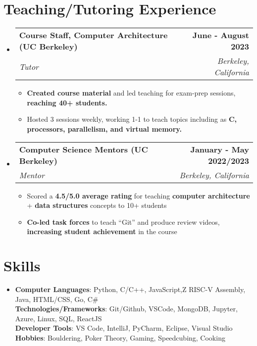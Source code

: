 \documentclass[letterpaper,11pt]{article}
\makeatletter
\newcommand{\resumeItem}[1]{
  \item\small{
    {#1 \vspace{-2pt}}
  }
}
\newcommand{\resumeSubheading}[4]{
  \vspace{-2pt}\item
    \begin{tabular*}{1.0\textwidth}[t]{l@{\extracolsep{\fill}}r}
      \textbf{#1} & \textbf{\small #2} \\
      \textit{\small#3} & \textit{\small #4} \\
    \end{tabular*}\vspace{-7pt}
}
\newcommand{\resumeSubHeadingListStart}{\begin{itemize}[leftmargin=0.0in, label={}]}
\newcommand{\resumeSubHeadingListEnd}{\end{itemize}}
\newcommand{\resumeItemListStart}{\begin{itemize}}
\newcommand{\resumeItemListEnd}{\end{itemize}\vspace{-5pt}}
\makeatother
\begin{document}
\vspace{0pt}


\section{Teaching/Tutoring Experience}
\resumeSubHeadingListStart

\resumeSubheading
{Course Staff, Computer Architecture (UC Berkeley)}{June - August 2023}
{Tutor}{Berkeley, California}
\resumeItemListStart
\resumeItem{\textbf{Created course material} and led teaching for exam-prep sessions, \textbf{reaching 40+ students.}}
  \resumeItem{Hosted 3 sessions weekly, working 1-1 to teach topics including as \textbf{C, processors, parallelism, and virtual memory.}}
  \resumeItemListEnd

\resumeSubheading
{Computer Science Mentors (UC Berkeley)}{January - May 2022/2023}
{Mentor}{Berkeley, California}
\resumeItemListStart
  \resumeItem{Scored a \textbf{4.5/5.0 average rating} for teaching \textbf{computer architecture} + \textbf{data structures} concepts to 10+ students}
  \resumeItem{\textbf{Co-led task forces} to teach ``Git'' and produce review videos, \textbf{increasing student achievement} in the course}
  \resumeItemListEnd

\resumeSubHeadingListEnd
\vspace{-16pt}

\section{Skills}
 \begin{itemize}[leftmargin=0.15in, label={}]
    \item{
      \textbf{Computer Languages}{: Python, C/C++, JavaScript,Z RISC-V Assembly, Java, HTML/CSS, Go, C\#} \\
      \vspace{4pt}
      \textbf{Technologies/Frameworks}{: Git/Github, VSCode, MongoDB, Jupyter, Azure, Linux, SQL, ReactJS} \\
      \vspace{4pt}
      \textbf{Developer Tools}{: VS Code, IntelliJ, PyCharm, Eclipse, Visual Studio} \\
      \vspace{4pt}
     \textbf{Hobbies}: Bouldering, Poker Theory, Gaming, Speedcubing, Cooking \\
    }

 \end{itemize}
 \vspace{-10pt}
 
                
\end{document}
